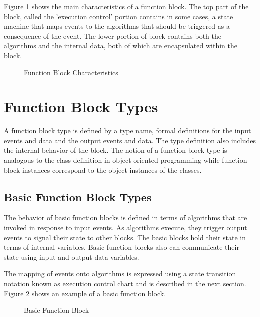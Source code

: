 Figure \ref{f:Function_Block_Char} shows the main
characteristics of a function block. The top part of the
block, called the 'execution control' portion contains in
some cases, a state machine that maps events to the
algorithms that should be triggered as a consequence of the
event. The lower portion of block contains both the
algorithms and the internal data, both of which are
encapsulated within the block.

\begin{figure}
  \begin{center}
    \caption[Function Block Characteristics]
            {Function Block Characteristics{\protect ~\cite{iec:614991:2000}}}
    \label{f:Function_Block_Char}
  \end{center}
\end{figure}




\section{Function Block Types}
A function block type is defined by a type name, formal
definitions for the input events and data and the output
events and data. The type definition also includes the
internal behavior of the block. The notion of a function
block type is analogous to the class definition in
object-oriented programming while function block instances
correspond to the object instances of the classes.

\subsection{Basic Function Block Types} 
The behavior of basic function blocks is defined in terms of
algorithms that are invoked in response to input events. As
algorithms execute, they trigger output events to signal
their state to other blocks. The basic blocks hold their
state in terms of internal variables. Basic function blocks
also can communicate their state using input and output data
variables.
  
The mapping of events onto algorithms is expressed using a
state transition notation known as execution control chart
and is described in the next section. Figure
\ref{f:Basic_Block} shows an example of a basic function
block.

\begin{figure}
  \begin{center}
    \caption[Basic Function Block]
            {Basic Function Block{\protect ~\cite{iec:614991:2000}}} 
    \label{f:Basic_Block}
  \end{center}
\end{figure}
  
